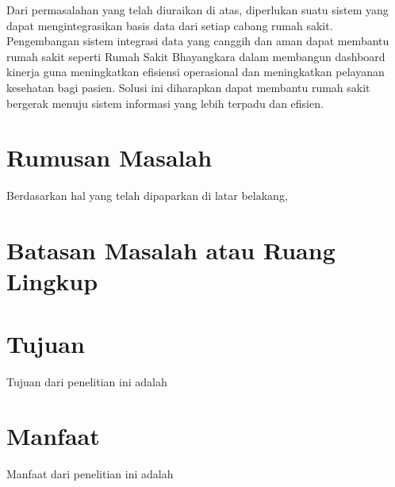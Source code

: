 Dari permasalahan yang telah diuraikan di atas, diperlukan suatu sistem yang dapat mengintegrasikan basis data dari setiap cabang rumah sakit.
Pengembangan sistem integrasi data yang canggih dan aman dapat membantu rumah sakit seperti Rumah Sakit Bhayangkara dalam membangun dashboard kinerja
guna meningkatkan efisiensi operasional dan meningkatkan pelayanan kesehatan bagi pasien. Solusi ini diharapkan dapat membantu rumah sakit
bergerak menuju sistem informasi yang lebih terpadu dan efisien. 

\section{Rumusan Masalah}

Berdasarkan hal yang telah dipaparkan di latar belakang, \lipsum[4]

\section{Batasan Masalah atau Ruang Lingkup}

\lipsum[6]

\section{Tujuan}

Tujuan dari penelitian ini adalah \lipsum[7][1-14]

\section{Manfaat}

Manfaat dari penelitian ini adalah \lipsum[8][1-14]
